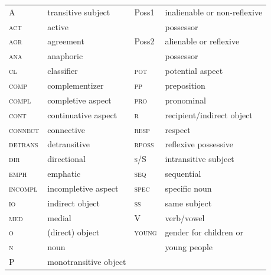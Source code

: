 \documentclass[output=collectionpaper]{langsci/langscibook}
\begin{document}
\begin{tabular}{llll}
  A	&	transitive subject	&	Poss1	&	inalienable or non-reflexive	\\
  \textsc{act}	&	active	&		&	possessor	\\
  \textsc{agr}	&	agreement	&	Poss2	&	alienable or reflexive	\\
  \textsc{ana}	&	anaphoric	&		&	possessor	\\
  \textsc{cl}	&	classifier	&	\textsc{pot}	&	potential aspect	\\
  \textsc{comp}	&	complementizer	&	\textsc{pp}	&	preposition	\\
  \textsc{compl}	&	completive aspect	&	\textsc{pro}	&	pronominal	\\
  \textsc{cont}	&	continuative aspect	&	\textsc{r}	&	recipient/indirect object	\\
  \textsc{connect}	&	connective	&	\textsc{resp}	&	respect	\\
  \textsc{detrans}	&	detransitive	&	\textsc{rposs}	&	reflexive possessive	\\
  \textsc{dir}	&	directional	&	\textsc{s}/S	&	intransitive subject	\\
  \textsc{emph}	&	emphatic	&	\textsc{seq}	&	sequential	\\
  \textsc{incompl}	&	incompletive aspect	&	\textsc{spec}	&	specific noun	\\
  \textsc{io}	&	indirect object	&	\textsc{ss}	&	same subject	\\
  \textsc{med}	&	medial	&	V	&	verb/vowel	\\
  \textsc{o}	&	(direct) object	&	\textsc{young}	&	gender for children or	\\
  \textsc{n}	&	noun	&		&	young people	\\
  P	&	monotransitive object	&				\\
\end{tabular}

{\sloppy\printbibliography[heading=subbibliography,notkeyword=this]}

\newpage


\newpage

\end{document}
